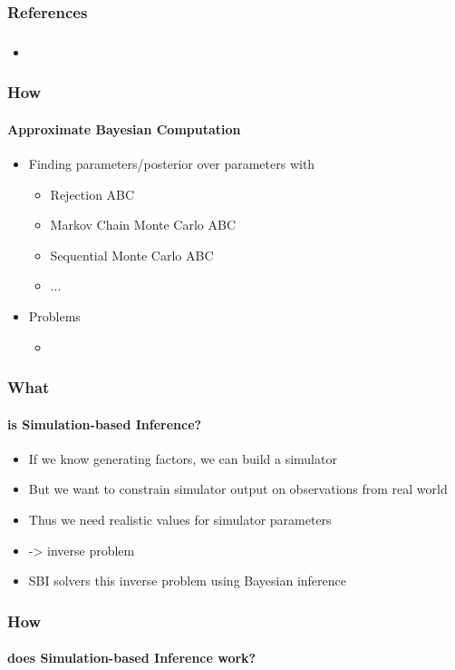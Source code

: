\documentclass[9pt]{beamer}
\begin{document}
\begin{frame}
\frametitle{References}
\framesubtitle{}

\end{frame} 




\begin{frame}
\frametitle{}
\framesubtitle{}
\begin{itemize}
	\item 
\end{itemize}
\end{frame} 



\begin{frame}
\frametitle{How}
\framesubtitle{Approximate Bayesian Computation}
\begin{itemize}
	\item Finding parameters/posterior over parameters with
	\begin{itemize}
		\item Rejection ABC
		\item Markov Chain Monte Carlo ABC
		\item Sequential Monte Carlo ABC
		\item ...
	\end{itemize}
	\item Problems
	\begin{itemize}
		\item 
	\end{itemize}
\end{itemize}
\end{frame} 



\begin{frame}
\frametitle{What}
\framesubtitle{is Simulation-based Inference?}
\begin{itemize}
	\item If we know generating factors, we can build a simulator
	\item But we want to constrain simulator output on observations from real world
	\item Thus we need realistic values for simulator parameters
	\item -> inverse problem
	\item SBI solvers this inverse problem using Bayesian inference
\end{itemize}
\end{frame} 


\begin{frame}
\frametitle{How}
\framesubtitle{does Simulation-based Inference work?}
\begin{figure}
\end{figure}
\end{frame} 
\end{document}
